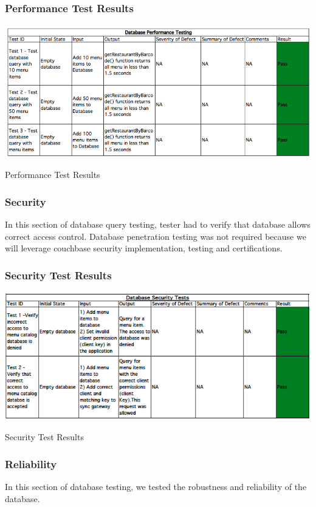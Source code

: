 \documentclass[12pt, titlepage]{article}
\begin{document}
\subsubsection{Performance Test Results}
\break
\begin{table}[h]
\includegraphics[width=\textwidth,height=\textheight,keepaspectratio]{performance_tests.png}
  \caption{Performance Test Results}
\end{table}

\subsubsection{Security}
In this section of database query testing, tester had to verify that database allows correct access control. Database penetration testing was not required because we will leverage couchbase security implementation, testing and certifications.
\subsubsection{Security Test Results}
\begin{table}[h]
\includegraphics[width=\textwidth,height=\textheight,keepaspectratio]{security_tests.png}
  \caption{Security Test Results}
\end{table}

\subsubsection{Reliability}
In this section of database testing, we tested the robustness and reliability of the database. 
\end{document}
